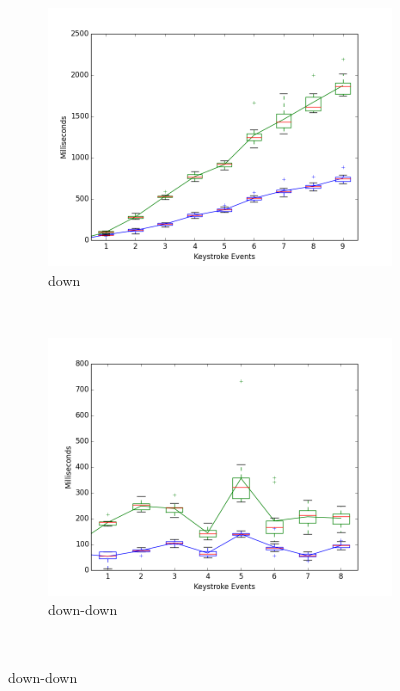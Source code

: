 \documentclass{article}
\begin{document}
\begin{figure}[H]
  \centering
  \begin{subfigure}[b]{0.3\textwidth}
    \includegraphics[width=\textwidth]{biedenharn_jordan_down_final.png}
    \caption{down}
    \label{all_graphs:down}
  \end{subfigure}%
  ~ %
  \begin{subfigure}[b]{0.3\textwidth}
    \includegraphics[width=\textwidth]{biedenharn_jordan_down-down_final.png}
    \caption{down-down}
    \label{all_graphs:down-down}
  \end{subfigure}
  ~ %

\end{figure}
\end{document}
